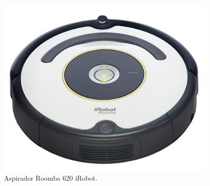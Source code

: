 \begin{itemize}
			\begin{figure}[H]
				\centering
				\includegraphics[scale=0.55]{figuras/pm_roomba.png}
				\caption{Aspirador Roomba 620 iRobot.}
				\label{img:pm_roomba}
			\end{figure}

	\end{itemize}


